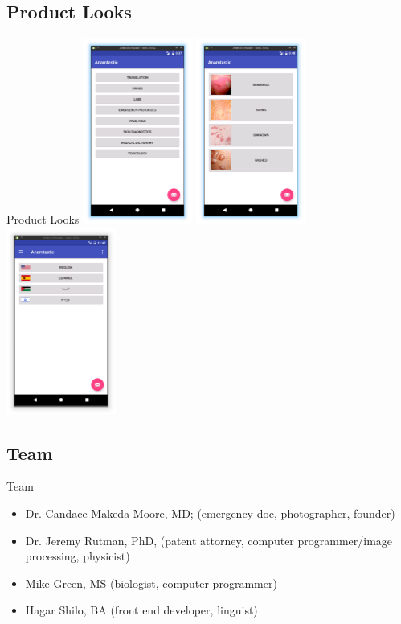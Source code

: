 \documentclass[presentation]{beamer}
\begin{document}
\subsection{Product Looks}
\label{sec-1-6}
\begin{frame}[label=sec-1-6-1]{Product Looks}
\includegraphics[width=3.6cm]{./presentation-images/module-selection-menu.png}
\includegraphics[width=3.6cm]{./presentation-images/skin-diagnostic-menu.png}
\includegraphics[width=3.6cm]{./presentation-images/language-select-menu.png}
\end{frame}

\subsection{Team}
\label{sec-1-7}
\begin{frame}[label=sec-1-7-1]{Team}
\begin{itemize}
\item Dr. Candace Makeda Moore, MD; (emergency doc, photographer, founder)
\item Dr. Jeremy Rutman, PhD, (patent attorney, computer programmer/image
processing, physicist)
\item Mike Green, MS (biologist, computer programmer)
\item Hagar Shilo, BA (front end developer, linguist)
\end{itemize}
\end{frame}
\end{document}
